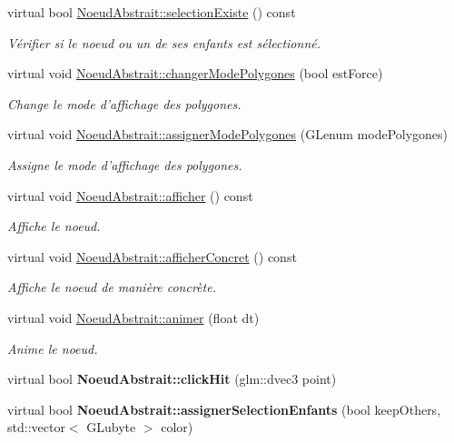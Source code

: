 \begin{DoxyCompactItemize}
virtual bool \hyperlink{group__inf2990_gae7c702b865babd20ddd30dd776adc82b}{Noeud\-Abstrait\-::selection\-Existe} () const 
\begin{DoxyCompactList}\small\item\em Vérifier si le noeud ou un de ses enfants est sélectionné. \end{DoxyCompactList}\item 
virtual void \hyperlink{group__inf2990_ga13a97383c2081b405fc2e0d97cff80df}{Noeud\-Abstrait\-::changer\-Mode\-Polygones} (bool est\-Force)
\begin{DoxyCompactList}\small\item\em Change le mode d'affichage des polygones. \end{DoxyCompactList}\item 
virtual void \hyperlink{group__inf2990_ga726d9d0a524939f405aeeac3fbd06666}{Noeud\-Abstrait\-::assigner\-Mode\-Polygones} (G\-Lenum mode\-Polygones)
\begin{DoxyCompactList}\small\item\em Assigne le mode d'affichage des polygones. \end{DoxyCompactList}\item 
virtual void \hyperlink{group__inf2990_gae789271ea41032d717b8e4300be05de0}{Noeud\-Abstrait\-::afficher} () const 
\begin{DoxyCompactList}\small\item\em Affiche le noeud. \end{DoxyCompactList}\item 
virtual void \hyperlink{group__inf2990_ga330df455c8b08440d3c8e64d0a480391}{Noeud\-Abstrait\-::afficher\-Concret} () const 
\begin{DoxyCompactList}\small\item\em Affiche le noeud de manière concrète. \end{DoxyCompactList}\item 
virtual void \hyperlink{group__inf2990_gadc6ebe69894dbb682fdd0ecb1b6c11e9}{Noeud\-Abstrait\-::animer} (float dt)
\begin{DoxyCompactList}\small\item\em Anime le noeud. \end{DoxyCompactList}\item 
\hypertarget{group__inf2990_gaa43f307d42d6dd8890cdce48c5c53128}{virtual bool {\bfseries Noeud\-Abstrait\-::click\-Hit} (glm\-::dvec3 point)}\label{group__inf2990_gaa43f307d42d6dd8890cdce48c5c53128}

\item 
\hypertarget{group__inf2990_ga2b6b37d21944528e0c02f563fa12927b}{virtual bool {\bfseries Noeud\-Abstrait\-::assigner\-Selection\-Enfants} (bool keep\-Others, std\-::vector$<$ G\-Lubyte $>$ color)}\label{group__inf2990_ga2b6b37d21944528e0c02f563fa12927b}


\end{DoxyCompactItemize}

